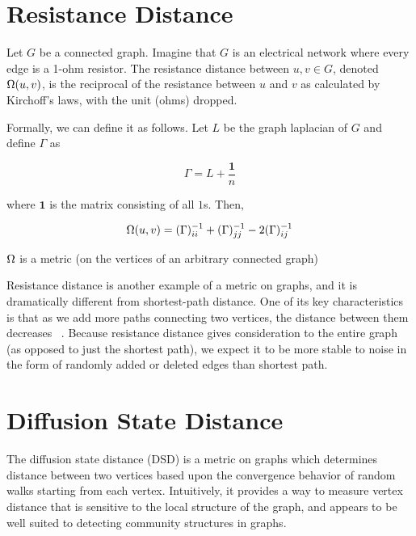\section{Resistance Distance}

\begin{definition}
  Let $G$ be a connected graph. Imagine that $G$ is an electrical network where every edge is a
  1-ohm resistor. The resistance distance between $u,v \in G$, denoted $\Omega(u,v)$, is the reciprocal
  of the resistance between $u$ and $v$ as calculated by Kirchoff's laws, with the unit (ohms)
  dropped.

  Formally, we can define it as follows. Let $L$ be the graph laplacian of $G$ and define $\Gamma$
  as

  \[ \Gamma = L + \frac{\mathbf{1}}{n} \]

  where $\mathbf{1}$ is the matrix consisting of all $1$s. Then,

  \[ \Omega(u,v) = (\Gamma)^{-1}_{ii} + (\Gamma)^{-1}_{jj} - 2(\Gamma)^{-1}_{ij}\]
\end{definition}

\begin{theorem}
  $\Omega$ is a metric (on the vertices of an arbitrary connected graph)
\end{theorem}

Resistance distance is another example of a metric on graphs, and it is dramatically different from
shortest-path distance. One of its key characteristics is that as we add more paths connecting two
vertices, the distance between them decreases ~\cite{KleinRandic1993}. Because resistance distance
gives consideration to the entire graph (as opposed to just the shortest path), we expect it to be
more stable to noise in the form of randomly added or deleted edges than shortest path.


\section{Diffusion State Distance}

The diffusion state distance (DSD) is a metric on graphs which determines distance between two
vertices based upon the convergence behavior of random walks starting from each vertex. Intuitively,
it provides a way to measure vertex distance that is sensitive to the local structure of the graph,
and appears to be well suited to detecting community structures in graphs.

